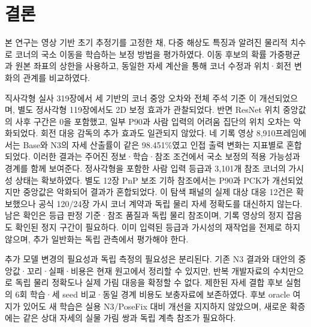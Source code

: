 \section{결론}\label{sec:conclusion}
본 연구는 영상 기반 초기 추정기를 고정한 채, 다중 해상도 특징과 알려진 물리적 치수로 코너의 국소 이동을 학습하는 보정 방법을 평가하였다. 이동 후보의 확률 가중평균과 원본 좌표의 상한을 사용하고, 동일한 자세 계산을 통해 코너 수정과 위치·회전 변화의 관계를 비교하였다.

직사각형 실사 319장에서 세 기반의 코너 중앙 오차와 전체 주석 기준 \pckten 이 개선되었으며, 별도 정사각형 119장에서도 2D 보정 효과가 관찰되었다. 반면 ResNet 위치 중앙값의 사후 구간은 0을 포함했고, 일부 P90과 사람 입력의 어려움 집단의 위치 오차는 악화되었다. 회전 대응 감독의 추가 효과도 일관되지 않았다. 네 기록 영상 8,910프레임에서는 Base와 N3의 자세 산출률이 같은 98.451\%였고 인접 출력 변화는 지표별로 혼합되었다. 이러한 결과는 주어진 정보·학습·참조 조건에서 국소 보정의 적용 가능성과 경계를 함께 보여준다. 정사각형을 포함한 사람 입력 등급과 3,101개 참조 코너의 가시성 상태는 확보하였다. 별도 12장 PnP 보조 기하 참조에서는 P90과 PCK가 개선되었지만 중앙값은 악화되어 결과가 혼합되었다. 이 탐색 패널의 실제 대상 대응 12건은 확보했으나 공식 120/24장 가시 코너 계약과 독립 물리 자세 정확도를 대신하지 않는다. 남은 확인은 등급 판정 기준·참조 품질과 독립 물리 참조이며, 기록 영상의 정지 잡음도 확인된 정지 구간이 필요하다. 이미 입력된 등급과 가시성의 재작업을 전제로 하지 않으며, 추가 일반화는 독립 관측에서 평가해야 한다.

추가 모델 변경의 필요성과 독립 측정의 필요성은 분리된다. 기존 N3 결과와 대안의 중앙값·꼬리·실패·비용은 현재 원고에서 정리할 수 있지만, 반복 개발자료의 수치만으로 독립 물리 정확도나 실제 가림 대응을 확정할 수 없다. 제한된 자세 결합 후보 실험의 6회 학습·세 seed 비교·동일 경계 비용도 보충자료에 보존하였다. 후보 oracle 여지가 있어도 새 학습은 실용 N3/PoseFix 대비 개선을 지지하지 않았으며, 새로운 확증에는 같은 상대 자세의 실물 가림 쌍과 독립 계측 참조가 필요하다.
